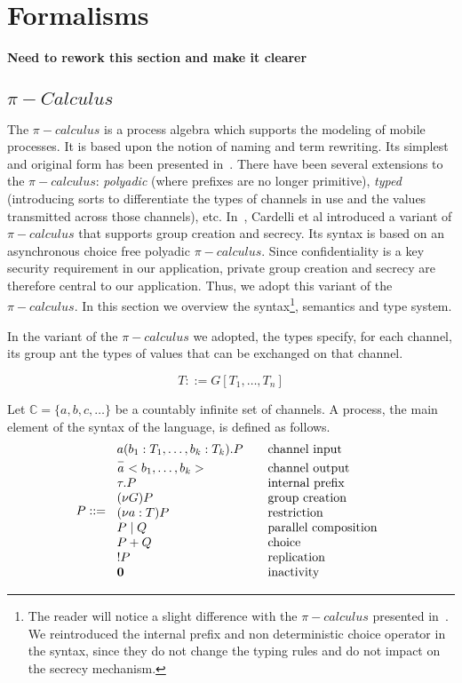 \section{Formalisms} %
\label{sec:formalisms}

\textbf{Need to rework this section and make it clearer}

\subsection{$\pi-Calculus$} %
\label{sub:_pi_calculus_}

The $\pi-calculus$ is a process algebra which supports the modeling of mobile processes. It is based upon the notion of
naming and term rewriting. Its simplest and original form has been presented in~\cite{Milner-Parrow-Walker:89}. There
have been several extensions to the $\pi-calculus$: \emph{polyadic} (where prefixes are no longer primitive),
\emph{typed} (introducing sorts to differentiate the types of channels in use and the values transmitted across those
channels), etc. In~\cite{Cardelli-Ghelli-Gordon:05}, Cardelli et al introduced a variant of $\pi-calculus$ that supports
group creation and secrecy. Its syntax is based on an asynchronous choice free polyadic $\pi-calculus$. Since
confidentiality is a key security requirement in our application, private group creation and secrecy are therefore
central to our application. Thus, we adopt this variant of the $\pi-calculus$. In this section we overview the
syntax\footnote{The reader will notice a slight difference with the $\pi-calculus$ presented
in~\cite{Cardelli-Ghelli-Gordon:05}. We reintroduced the internal prefix and non deterministic choice operator in the
syntax, since they do not change the typing rules and do not impact on the secrecy mechanism.}, semantics and type
system.

In the variant of the $\pi-calculus$ we adopted, the types specify, for each channel, its group ant the types of values
that can be exchanged on that channel.

\begin{displaymath}
	T::=G[T_1,\ldots, T_n]
\end{displaymath}

Let $\mathbb{C}=\{a,b,c,\ldots\}$ be a countably infinite set of channels. A process, the main element of the syntax of the language, is defined as follows. 
\[
P::= \left. \begin{array}{l l}
a(b_1:T_1,\ldots,b_k:T_k).P & \quad \mbox{channel input}\\
\overset{-}{a}<b_1,\ldots,b_k> & \quad \mbox{channel output}\\
\tau.P & \quad \mbox{internal prefix}\\
(\nu G)P & \quad \mbox{group creation}\\
(\nu a:T)P & \quad \mbox{restriction}\\
P\mid Q & \quad \mbox{parallel composition}\\
P + Q & \quad \mbox{choice}\\
!P & \quad \mbox{replication}\\
\mathbf{0} & \quad \mbox{inactivity}\\
\end{array} \right.
\]


